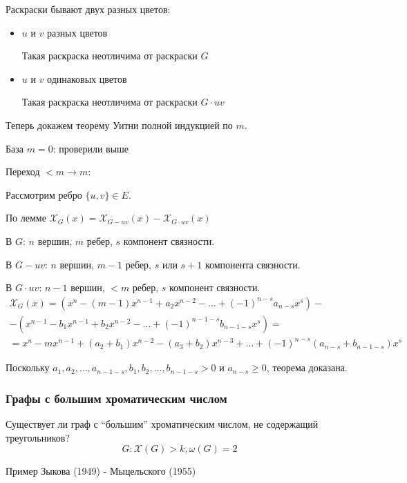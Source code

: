 Раскраски бывают двух разных цветов:
\begin{itemize}
    \item
        \( u \) и \( v \) разных цветов

        Такая раскраска неотличима от раскраски \( G \)
    \item
        \( u \) и \( v \) одинаковых цветов

        Такая раскраска неотличима от раскраски \( G \cdot uv \)
\end{itemize}

Теперь докажем теорему Уитни полной индукцией по \( m \).

База \( m = 0 \): проверили выше

Переход \( < m \to m \):

Рассмотрим ребро \( \{ u, v \} \in E \).

По лемме \( \mathcal{X}_G(x) = \mathcal{X}_{G - uv}(x) - \mathcal{X}_{G \cdot uv}(x) \)

В \( G \): \( n \) вершин, \( m \) ребер, \( s \) компонент связности.

В \( G - uv \): \( n \) вершин, \( m - 1 \) ребер, \( s \) или \( s + 1 \) компонента связности.

В \( G \cdot uv \): \( n - 1 \) вершин, \( < m \) ребер, \( s \) компонент связности.
\begin{gather*}
    \mathcal{X}_G(x)
    =
    (x^n - (m - 1) x^{n - 1} + a_2 x^{n - 2} - \ldots + (-1)^{n - s} a_{n - s} x^s)
    -
    \\
    -
    (x^{n - 1} - b_1 x^{n - 1} + b_2 x^{n - 2} - \ldots + (-1)^{n - 1 - s} b_{n - 1 - s} x^s)
    =
    \\
    = x^n - m x^{n - 1} + (a_2 + b_1) x^{n - 2} - (a_3 + b_2) x^{n - 3} + \ldots + (-1)^{n - s} (a_{n - s} + b_{n - 1 - s}) x^s
\end{gather*}

Поскольку \( a_1, a_2, \ldots, a_{n - 1 - s}, b_1, b_2, \ldots, b_{n - 1 - s} > 0 \) и \( a_{n - s} \geq 0 \),
теорема доказана.

\subsubsection{Графы с большим хроматическим числом}

Существует ли граф с ``большим'' хроматическим числом, не содержащий треугольников?
\[
    G : \mathcal{X}(G) > k, \omega(G) = 2
\]

Пример Зыкова (1949) - Мыцельского (1955)

